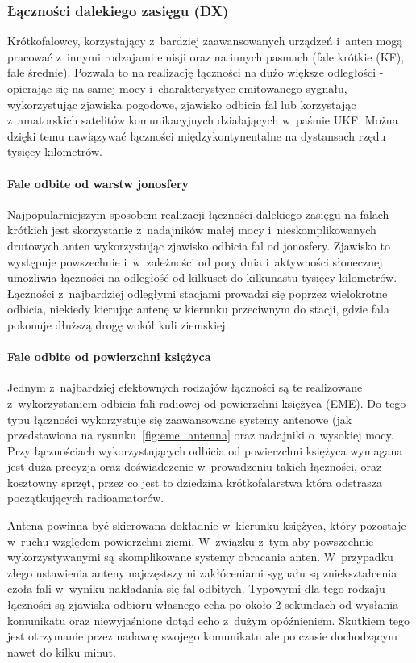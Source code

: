\documentclass[]{mgr}
\begin{document}
                \subsubsection{Łączności dalekiego zasięgu (DX)}
                Krótkofalowcy, korzystający z~bardziej zaawansowanych urządzeń i~anten mogą pracować z~innymi rodzajami emisji oraz na innych pasmach (fale krótkie (KF), fale średnie). Pozwala to na realizację łączności na dużo większe odległości - opierając się na samej mocy i~charakterystyce emitowanego sygnału, wykorzystując zjawiska pogodowe, zjawisko odbicia fal lub korzystając z~amatorskich satelitów komunikacyjnych działających w~paśmie UKF. Można dzięki temu nawiązywać łączności międzykontynentalne na dystansach rzędu tysięcy kilometrów.

                    \paragraph{Fale odbite od warstw jonosfery}
                    Najpopularniejszym sposobem realizacji łączności dalekiego zasięgu na falach krótkich jest skorzystanie z~nadajników małej mocy i~nieskomplikowanych drutowych anten wykorzystując zjawisko odbicia fal od jonosfery. Zjawisko to występuje powszechnie i~w~zależności od pory dnia i~aktywności słonecznej umożliwia łączności na odległość od kilkuset do kilkunastu tysięcy kilometrów. Łączności z~najbardziej odległymi stacjami prowadzi się poprzez wielokrotne odbicia, niekiedy kierując antenę w kierunku przeciwnym do stacji, gdzie fala pokonuje dłuższą drogę wokół kuli ziemskiej.

                    \paragraph{Fale odbite od powierzchni księżyca}
                    Jednym z~najbardziej efektownych rodzajów łączności są te realizowane z~wykorzystaniem odbicia fali radiowej od powierzchni księżyca (EME). Do tego typu łączności wykorzystuje się zaawansowane systemy antenowe (jak przedstawiona na rysunku~\ref{fig:eme_antenna} oraz nadajniki o~wysokiej mocy. Przy łącznościach wykorzystujących odbicia od powierzchni księżyca wymagana jest duża precyzja oraz doświadczenie w~prowadzeniu takich łączności, oraz kosztowny sprzęt, przez co jest to dziedzina krótkofalarstwa która odstrasza początkujących radioamatorów. 

                    Antena powinna być skierowana dokładnie w~kierunku księżyca, który pozostaje w~ruchu względem powierzchni ziemi. W~związku z~tym aby powszechnie wykorzystywanymi są skomplikowane systemy obracania anten. W~przypadku złego ustawienia anteny najczęstszymi zakłóceniami sygnału są zniekształcenia czoła fali w~wyniku nakładania się fal odbitych. Typowymi dla tego rodzaju łączności są zjawiska odbioru własnego echa po około 2 sekundach od wysłania komunikatu oraz niewyjaśnione dotąd echo z~dużym opóźnieniem. Skutkiem tego jest otrzymanie przez nadawcę swojego komunikatu ale po czasie dochodzącym nawet do kilku minut.
\end{document}
